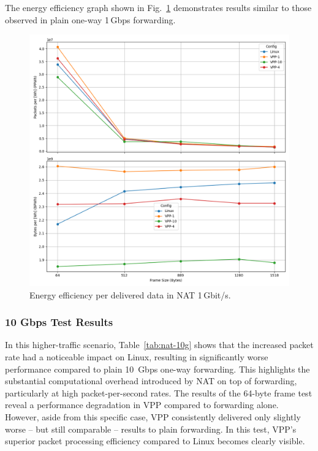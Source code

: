 The energy efficiency graph shown in Fig.~\ref{fig:nat-1g} demonstrates results similar to those observed in plain one-way 1\,Gbps forwarding.

\begin{figure}[!htbp]
    \centering
    \includegraphics[width=\linewidth]{images/consumption-nat-1g.png}
    \caption{Energy efficiency per delivered data in NAT 1\,Gbit/s.}
    \label{fig:nat-1g}
\end{figure}

\subsubsection{10 Gbps Test Results}

In this higher-traffic scenario, Table~\ref{tab:nat-10g} shows that the increased packet rate had a noticeable impact on Linux, 
resulting in significantly worse performance compared to plain 10~Gbps one-way forwarding.
This highlights the substantial computational overhead introduced by NAT on top of forwarding, particularly at high packet-per-second rates.
The results of the 64-byte frame test reveal a performance degradation in VPP compared to forwarding alone.  
However, aside from this specific case, VPP consistently delivered only slightly worse -- but still comparable -- results to plain forwarding.
In this test, VPP's superior packet processing efficiency compared to Linux becomes clearly visible.

